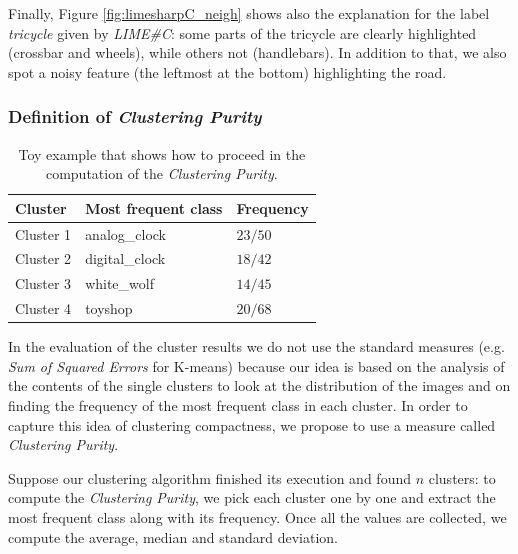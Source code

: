 \documentclass[12pt, twoside, a4paper]{report}
\begin{document}

Finally, Figure \ref{fig:limesharpC_neigh} shows also the explanation for the label \textit{tricycle} given by \textit{LIME\#C}: some parts of the tricycle are clearly highlighted (crossbar and wheels), while others not (handlebars). In addition to that, we also spot a noisy feature (the leftmost at the bottom) highlighting the road.


\subsubsection{Definition of \textit{Clustering Purity}}

\begin{table}[]
\centering
\def\arraystretch{1.3}
\begin{tabular}{|l|l|l|}
\hline
\textbf{Cluster} & \textbf{Most frequent class} & \textbf{Frequency} \\\hline
Cluster 1 & analog\_clock & $23/50$ \\\hline
Cluster 2 & digital\_clock & $18/42$ \\\hline
Cluster 3 & white\_wolf & $14/45$ \\\hline
Cluster 4 & toyshop & $20/68$\\\hline
\end{tabular}
\caption{Toy example that shows how to proceed in the computation of the \textit{Clustering Purity}.}
\label{tab:cluster_purity_example}
\end{table}

In the evaluation of the cluster results we do not use the standard measures (e.g. \textit{Sum of Squared Errors} for K-means) because our idea is based on the analysis of the contents of the single clusters to look at the distribution of the images and on finding the frequency of the most frequent class in each cluster. In order to capture this idea of clustering compactness, we propose to use a measure called \textit{Clustering Purity}. 

Suppose our clustering algorithm finished its execution and found $n$ clusters: to compute the \textit{Clustering Purity}, we pick each cluster one by one and extract the most frequent class along with its frequency. Once all the values are collected, we compute the average, median and standard deviation.
\end{document}
